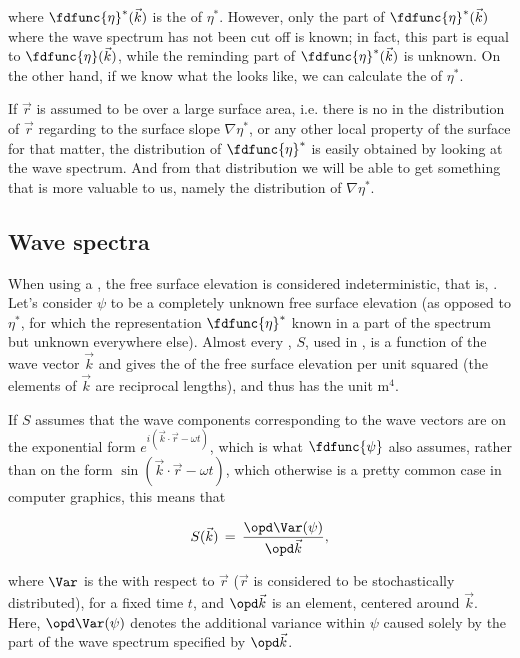 where $\fdfunc{\eta}^*(\vec{k})$ is the  of $\eta^*$. However, only the part of $\fdfunc{\eta}^*(\vec{k})$ where the wave spectrum has not been cut off is known; in fact, this part is equal to $\fdfunc{\eta}(\vec{k})$, while the reminding part of $\fdfunc{\eta}^*(\vec{k})$ is unknown. On the other hand, if we know what the  looks like, we can calculate the  of $\eta^*$.

If $\vec{r}$ is assumed to be  over a large surface area, i.e. there is no \bias in the distribution of $\vec{r}$ regarding to the surface slope $\nabla\eta^*$, or any other local property of the surface for that matter, the distribution of $\fdfunc{\eta}^*$ is easily obtained by looking at the wave spectrum. And from that distribution we will be able to get something that is more valuable to us, namely the distribution of $\nabla\eta^*$.

\subsection{Wave spectra}

When using a , the free surface elevation is considered indeterministic, that is, \stochastic. Let's consider $\psi$ to be a completely unknown free surface elevation (as opposed to $\eta^*$, for which the  representation $\fdfunc{\eta}^*$ known in a part of the spectrum but unknown everywhere else). Almost every , $S$, used in , is a function of the wave vector $\vec{k}$ and gives the \variance of the free surface elevation per unit  squared (the elements of $\vec{k}$ are reciprocal lengths), and thus has the unit $\text{m}^4$. 

If $S$ assumes that the wave components corresponding to the wave vectors are on the exponential form $e^{i(\vec{k}\cdot\vec{r}-\omega t)}$, which is what $\fdfunc{\psi}$ also assumes, rather than on the \sinusoidal form $\sin(\vec{k}\cdot\vec{r}-\omega t)$, which otherwise is a pretty common case in computer graphics, this means that

\begin{equation} \label{eq:wave_spectrum_definition}
S(\vec{k}) \,=\, \frac{\opd \Var(\psi)}{\opd\vec{k}},
\end{equation}

where $\Var$ is the  with respect to $\vec{r}$ ($\vec{r}$ is considered to be stochastically distributed), for a fixed time $t$, and $\opd\vec{k}$ is an \infinitesimal {} element, centered around $\vec{k}$. Here, $\opd\Var(\psi)$ denotes the additional variance within $\psi$ caused solely by the part of the wave spectrum specified by $\opd\vec{k}$.

